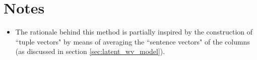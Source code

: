 \section{Notes} 
\begin{itemize}
    \item The rationale behind this method is partially inspired by the construction of ``tuple vectors" by means of averaging the ``sentence vectors" of the columns (as discussed in section \ref{sec:latent_wv_model}).

\end{itemize}
